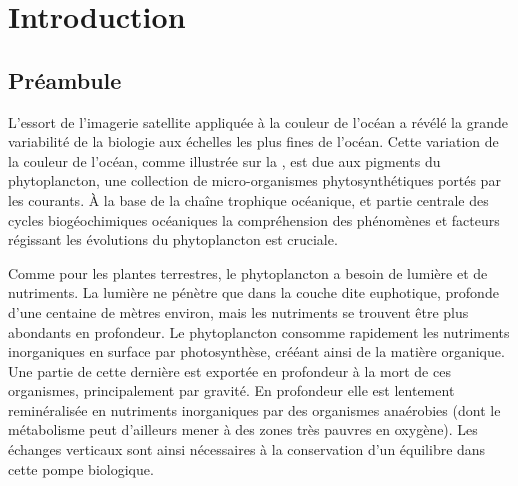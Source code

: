 
\chapter{Introduction}
\addChpLof
\label{chp:introduction}
\graphicspath{{resources/introduction}}

\minitoc%
\clearpage

\begin{figure}[!h]
  \centering
  {%
    \setlength{\fboxsep}{0pt}%
  }%
  \label{fig:oc-illustration}
\end{figure}

\vspace{1\baselineskip}

\section{Préambule}

L'essort de l'imagerie satellite appliquée à la couleur de l'océan  a révélé la grande variabilité de la biologie aux échelles les plus fines de l'océan.
Cette variation de la couleur de l'océan, comme illustrée sur la , est due aux pigments du phytoplancton, une collection de micro-organismes phytosynthétiques portés par les courants.
À la base de la chaîne trophique océanique, et partie centrale des cycles biogéochimiques océaniques  la compréhension des phénomènes et facteurs régissant les évolutions du phytoplancton est cruciale.

Comme pour les plantes terrestres, le phytoplancton a besoin de lumière et de nutriments.
La lumière ne pénètre que dans la couche dite euphotique, profonde d'une centaine de mètres environ, mais les nutriments se trouvent être plus abondants en profondeur.
Le phytoplancton consomme rapidement les nutriments inorganiques en surface par photosynthèse, crééant ainsi de la matière organique.
Une partie de cette dernière est exportée en profondeur à la mort de ces organismes, principalement par gravité.
En profondeur elle est lentement reminéralisée en nutriments inorganiques par des organismes anaérobies (dont le métabolisme peut d'ailleurs mener à des zones très pauvres en oxygène).
Les échanges verticaux  sont ainsi nécessaires à la conservation d'un équilibre dans cette pompe biologique.

